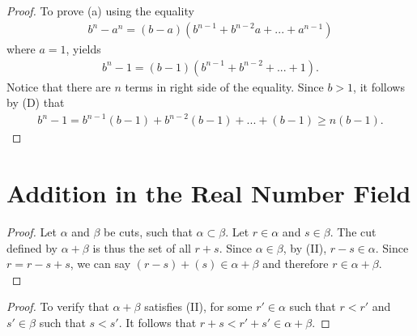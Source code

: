 \documentclass[12pt]{article}
\begin{document}
\subsection{}
\begin{proof}
				To prove (a) using the equality
				\begin{gather*}
								b^n-a^n=(b-a)(b^{n-1}+b^{n-2}a+...+a^{n-1})
				\end{gather*}
				where $a=1$, yields
				\begin{gather*}
								b^n-1=(b-1)(b^{n-1}+b^{n-2}+...+1).
				\end{gather*}
				Notice that there are $n$ terms in right side of the equality. Since $b>1$, 
				it follows by (D) that
				\begin{gather*}
								b^n-1=b^{n-1}(b-1)+b^{n-2}(b-1)+...+(b-1)\geq n(b-1).
				\end{gather*}
\end{proof}

\section{Addition in the Real Number Field}
\begin{proof}
Let $\alpha$ and $\beta$ be cuts, such that $\alpha\subset\beta$. 
Let $r\in\alpha$ and $s\in\beta$. The cut defined by $\alpha+\beta$ is thus the set of all $r+s$. 
Since $\alpha\in\beta$, by (II), $r-s\in\alpha$. Since $r=r-s+s$, we can say $(r-s)+(s)
\in\alpha+\beta$ and therefore $r\in\alpha+\beta$.\\
\end{proof}

\begin{proof}
To verify that $\alpha + \beta$ satisfies (II), for some $r' \in \alpha$ such that $r < r'$ and 
$s' \in \beta$ such that $s < s'$. It follows that $r + s < r' + s' \in \alpha + \beta$.
\end{proof}
\end{document}
